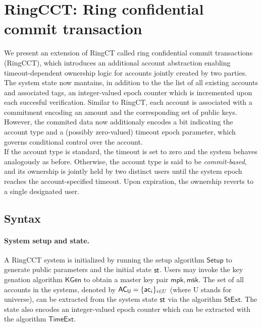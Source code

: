 
\section{RingCCT: Ring confidential commit transaction}
We present an extension of RingCT called ring confidential commit transactions (RingCCT), 
which introduces an additional account abstraction enabling timeout-dependent ownership logic for accounts jointly created by two parties. The system state now mantains, in addition to the the list of all existing accounts and associated tags, an integer-valued epoch counter which is incremented upon each succesful verification. Similar to RingCT, each account is associated with a commitment encoding an amount and the corresponding set of public keys. However, the commited data now additionaly encodes a bit indicating the account type and a (possibly zero-valued) timeout epoch parameter, which governs conditional control over the account. \\ 
If the account type is standard, the timeout is set to zero and the system behaves analogously as before. Otherwise, the account type is said to be \textit{commit-based}, and its ownership is jointly held by two distinct users until the system epoch reaches the account-specified timeout. Upon expiration, the ownership reverts to a single designated user. 

\subsection{Syntax}
\paragraph*{System setup and state.} A RingCCT system is initialized by running the setup algorithm $\mathsf{Setup}$ to generate public parameters and the initial state $\st$. Users may invoke the key genation algorithm $\mathsf{KGen}$ to obtain a master key pair $\mathsf{mpk}, \mathsf{msk}$. 
The set of all accounts in the systems, denoted by $\mathsf{AC_U} = \{ \mathsf{ac}_i \}_{i\in U}$ (where U stands for universe), can be extracted from the system state $\st$ via the algorithm $\mathsf{StExt}$. The state also encodes an integer-valued epoch counter which can be extracted with the algorithm $\mathsf{TimeExt}$.

